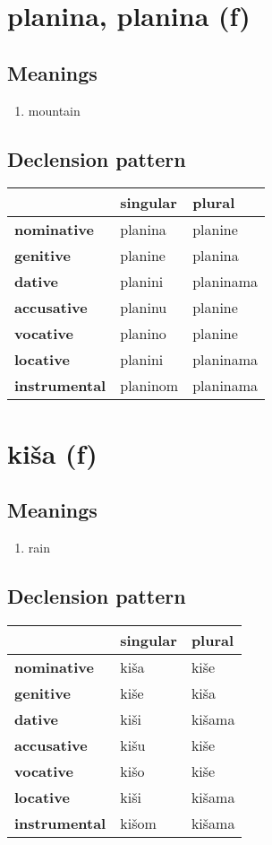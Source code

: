 \filbreak
\section{planina, planina (f)}
\subsection*{Meanings}
\begin{enumerate}
\item mountain
\end{enumerate}
\subsection*{Declension pattern}
\begin{tabularx}{\linewidth}{Xll}
\toprule
{} &  singular &     plural \\
\midrule
\textbf{nominative  } &   planina &    planine \\
\textbf{genitive    } &   planine &    planina \\
\textbf{dative      } &   planini &  planinama \\
\textbf{accusative  } &   planinu &    planine \\
\textbf{vocative    } &   planino &    planine \\
\textbf{locative    } &   planini &  planinama \\
\textbf{instrumental} &  planinom &  planinama \\
\bottomrule
\end{tabularx}

\filbreak
\section{kiša (f)}
\subsection*{Meanings}
\begin{enumerate}
\item rain
\end{enumerate}
\subsection*{Declension pattern}
\begin{tabularx}{\linewidth}{Xll}
\toprule
{} & singular &  plural \\
\midrule
\textbf{nominative  } &     kiša &    kiše \\
\textbf{genitive    } &     kiše &    kiša \\
\textbf{dative      } &     kiši &  kišama \\
\textbf{accusative  } &     kišu &    kiše \\
\textbf{vocative    } &     kišo &    kiše \\
\textbf{locative    } &     kiši &  kišama \\
\textbf{instrumental} &    kišom &  kišama \\
\bottomrule
\end{tabularx}

